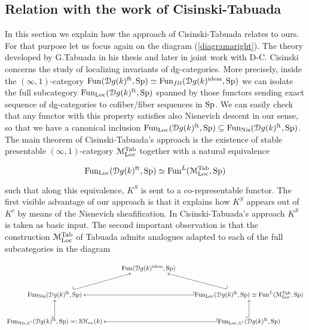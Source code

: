 \begin{refsection}
\section{Relation with the work of Cisinski-Tabuada}

In this section we explain how the approach of Cisinski-Tabuada relates to ours. For that purpose let us focus again on the diagram  (\ref{diagramaright}). The theory developed by G.Tabuada \cite{tabuada-higherktheory} in his thesis and later in joint work with D-C. Cisinski \cite{tabuada-cisinski, MR2822869} concerns the study of localizing invariants of dg-categories. More precisely, inside the $(\infty,1)$-category $\mathrm{Fun}(\mathcal{D}g(k)^\mathrm{ft}, \mathrm{Sp})\simeq \mathrm{Fun}_{flt}(\mathcal{D}g(k)^\mathrm{idem}, \mathrm{Sp})$ we can isolate the full subcategory $\mathrm{Fun}_\mathrm{Loc}(\mathcal{D}g(k)^\mathrm{ft}, \mathrm{Sp})$ spanned by those functors sending exact sequence of dg-categories to cofiber/fiber sequences in $\mathrm{Sp}$. We can easily check that any functor with this property satisfies also Nisnevich descent in our sense, so that we have a canonical inclusion  $\mathrm{Fun}_\mathrm{Loc}(\mathcal{D}g(k)^\mathrm{ft}, \mathrm{Sp})\subseteq \mathrm{Fun}_\mathrm{Nis}(\mathcal{D}g(k)^\mathrm{ft}, \mathrm{Sp})$. The main theorem of Cisinski-Tabuada's approach is the existence of stable presentable $(\infty,1)$-category $\mathcal{M}^\mathrm{Tab}_\mathrm{Loc}$ together with a natural equivalence 

\begin{equation}
\label{final}
\mathrm{Fun}_\mathrm{Loc}(\mathcal{D}g(k)^\mathrm{ft}, \mathrm{Sp})\simeq \mathrm{Fun}^L(\mathcal{M}^\mathrm{Tab}_\mathrm{Loc},\mathrm{Sp})
\end{equation}

\noindent such that along this equivalence, $K^S$ is sent to a co-representable functor. The first visible advantage of our approach is that it explains how $K^S$ appears out of $K^c$ by means of the Nisnevich sheafification. In Cisinski-Tabuada's approach $K^S$ is taken as basic input. The second important observation is that the construction  $\mathcal{M}^\mathrm{Tab}_\mathrm{Loc}$ of Tabuada admits analogues adapted to each of  the full subcategories in the diagram


\begin{equation}
\xymatrix{
&\mathrm{Fun}(\mathcal{D}g(k)^\mathrm{idem}, \Sp)&\\
 \mathrm{Fun}_\mathrm{Nis}(\mathcal{D}g(k)^\mathrm{ft}, \Sp)\ar@{^{(}->}[ur]&&\ar@{_{(}->}[ll] \ar@{_{(}->}[ul]\mathrm{Fun}_\mathrm{Loc}(\mathcal{D}g(k)^\mathrm{ft}, \Sp)\simeq \mathrm{Fun}^{L}(\M^\mathrm{Tab}_\mathrm{Loc}, \Sp)\\
 \mathrm{Fun}_{\mathrm{Nis}, \mathbb{A}^1}(\mathcal{D}g(k)^\mathrm{ft}, \Sp)=: \stnck\ar@{^{(}->}[u]&&\ar@{_{(}->}[ll]\ar@{^{(}->}[u]\mathrm{Fun}_{\mathrm{Loc}, \mathbb{A}^1}(\mathcal{D}g(k)^\mathrm{ft}, \Sp)
}
\end{equation}


\end{refsection}
